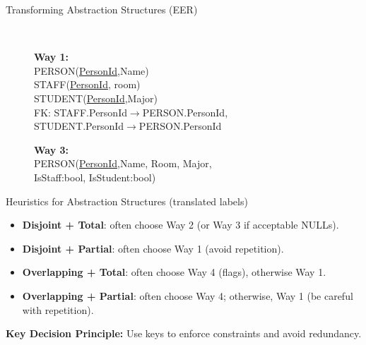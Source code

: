 \documentclass[10pt,aspectratio=169]{beamer}
\begin{document}
\begin{frame}{Transforming Abstraction Structures (EER)}
\begin{figure}
$\quad$
\begin{minipage}{0.4\linewidth}
\vspace{-3.5cm}

{\small
\textbf{Way 1:}\\ PERSON(\underline{PersonId},Name)\\
STAFF(\underline{PersonId}, room)\\
STUDENT(\underline{PersonId},Major)\\
FK: STAFF.PersonId$\rightarrow$PERSON.PersonId,\\
STUDENT.PersonId$\rightarrow$PERSON.PersonId

\textbf{Way 3:}\\ PERSON(\underline{PersonId},Name, Room, Major, \\
IsStaff:bool, IsStudent:bool)}
\end{minipage}
\end{figure}
\end{frame}

\begin{frame}{Heuristics for Abstraction Structures (translated labels)}
\vspace{1mm}
\begin{itemize}
  \item \textbf{Disjoint + Total}: often choose Way 2 (or Way 3 if acceptable NULLs).
  \item \textbf{Disjoint + Partial}: often choose Way 1 (avoid repetition).
  \item \textbf{Overlapping + Total}: often choose Way 4 (flags), otherwise Way 1.
  \item \textbf{Overlapping + Partial}: often choose Way 4; otherwise, Way 1 (be careful with repetition).
\end{itemize}
\textbf{Key Decision Principle:} Use keys to enforce constraints and avoid redundancy.
\end{frame}
\end{document}
